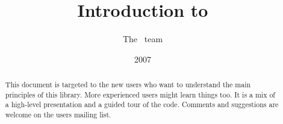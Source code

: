 \documentclass[a4paper,11pt]{article}
\title{Introduction to \sofa}
\author{The \sofa~team}
\date{2007}
\begin{document}
 
\maketitle

\begin{abstract}
This document is targeted to the new \sofa users who want to understand the main principles of this library. More experienced users might learn things too.
It is a mix of a high-level presentation and a guided tour of the code.
Comments and suggestions are welcome on the \sofa users mailing list.
\end{abstract}


\end{document}
